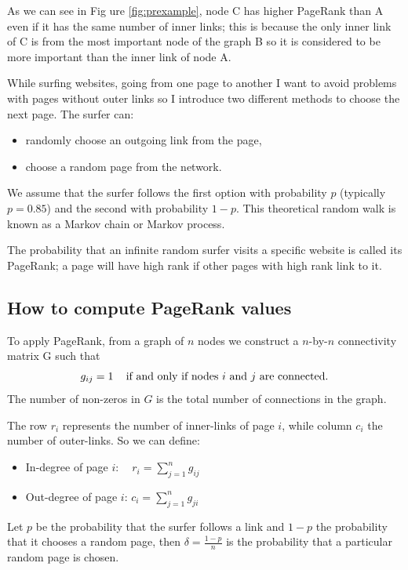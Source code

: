 \documentclass[]{usiinfbachelorproject}
\newcommand\tab[1][1cm]{\hspace*{#1}}
\begin{document}
As we can see in Fig ure \ref{fig:prexample}, node C has higher PageRank than A even if it has the same number of inner links; this is because the only inner link of C is from the most important node of the graph B so it is considered to be more important than the inner link of node A.

While surfing websites, going from one page to another I want to avoid problems with pages without outer links so I introduce two different methods to choose the next page. The surfer can:
\begin{itemize}
\item randomly choose an outgoing link from the page,
\item choose a random page from the network.
\end{itemize}
We assume that the surfer follows the first option with probability $p$ (typically $p=0.85$) and the second with probability $1-p$. This theoretical random walk is known as a Markov chain or Markov process.

The probability that an infinite random surfer visits a specific website is called its PageRank; a page will have high rank if other pages with high rank link to it.


\subsection{How to compute PageRank values}
To apply PageRank, from a graph of $n$ nodes we construct a $n$-by-$n$ connectivity matrix G such that
\begin{equation*}
g_{ij}=1 \text{\;\;\; if and only if nodes $i$ and $j$ are connected.} 
\end{equation*}
The number of non-zeros in $G$ is the total number of connections in the graph.

The row $r_i$ represents the number of inner-links of page $i$, while column $c_i$ the number of outer-links. So we can define:
\begin{itemize}
\item In-degree of page $i$: \tab $\:\:\:\:r_i = \sum\limits_{j=1}^{n} g_{ij}$
\item Out-degree of page $i$: \tab $c_i = \sum\limits_{j=1}^{n} g_{ji}$
\end{itemize}
Let $p$ be the probability that the surfer follows a link and $1-p$ the probability that it chooses a random page, then $\delta = \frac{1-p}{n}$ is the probability that a particular random page is chosen.
\end{document}
